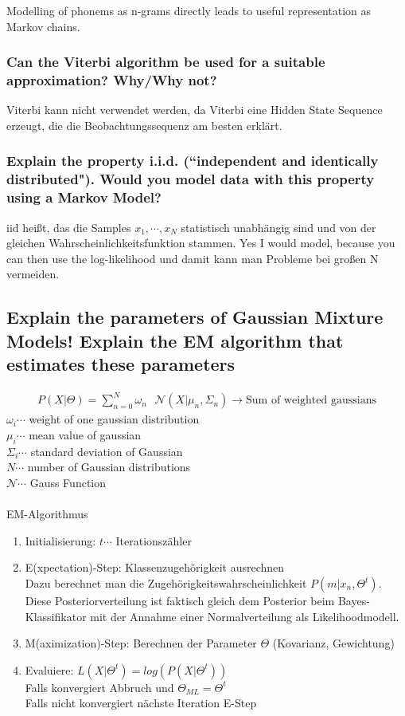 \documentclass[12pt]{scrartcl}
\begin{document}
Modelling of phonems as n-grams directly leads to useful representation as Markov chains.

\subsubsection{Can the Viterbi algorithm be used for a suitable approximation? Why/Why not?}
\label{Viterbi}
Viterbi kann nicht verwendet werden, da Viterbi eine Hidden State Sequence erzeugt, die die Beobachtungssequenz am besten erklärt.

\subsubsection{Explain the property i.i.d. (``independent and identically distributed"). Would you model data with this property using a Markov Model?}

iid heißt, das die Samples $x_1, \cdots ,x_N$ statistisch unabhängig sind und von der gleichen Wahrscheinlichkeitsfunktion stammen. Yes I would model, because you can then use the log-likelihood und damit kann man Probleme bei großen N vermeiden.

\subsection{Explain the parameters of Gaussian Mixture Models! Explain the EM algorithm that estimates these parameters}

\begin{align*}
P(X|\Theta) = \sum_{n=0}^N \omega_n \text{ } \mathcal{N}(X|\mu_n, \Sigma_n) \rightarrow \text{Sum of weighted gaussians}
\end{align*}
$\omega_i \cdots$ weight of one gaussian distribution \\
$\mu_i \cdots$ mean value of gaussian \\
$\Sigma_i \cdots$ standard deviation of Gaussian \\
$N \cdots$ number of Gaussian distributions \\
$\mathcal{N} \cdots$ Gauss Function \\
\\
EM-Algorithmus
\begin{enumerate}
\item Initialisierung: $t \cdots$ Iterationszähler
\item E(xpectation)-Step: Klassenzugehörigkeit ausrechnen \\
Dazu berechnet man die Zugehörigkeitswahrscheinlichkeit $P(m|x_n,\Theta^t)$. Diese Posteriorverteilung ist faktisch gleich dem Posterior beim Bayes-Klassifikator mit der Annahme einer Normalverteilung als Likelihoodmodell.
\item M(aximization)-Step: Berechnen der Parameter $\Theta$ (Kovarianz, Gewichtung)
\item Evaluiere: $L(X|\Theta^t) = log(P(X|\Theta^t))$ \\
Falls konvergiert Abbruch und $\Theta_{ML} = \Theta^t$ \\
Falls nicht konvergiert nächste Iteration E-Step 
\end{enumerate}
\end{document}
